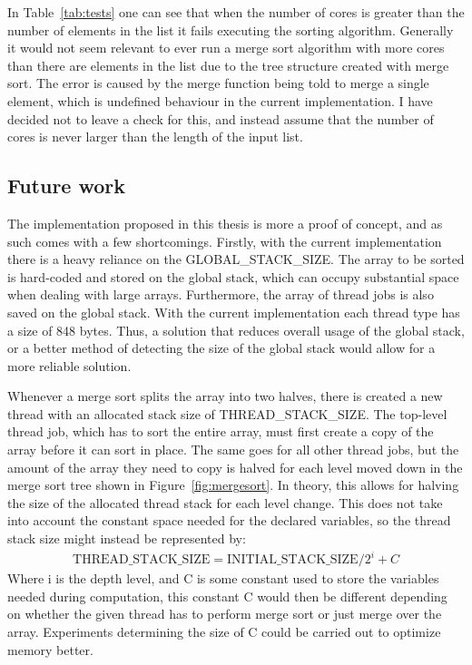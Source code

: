 In Table~\ref{tab:tests} one can see that when the number of cores is greater than
the number of elements in the list it fails executing the sorting algorithm.
Generally it would not seem relevant to ever run a merge sort algorithm with
more cores than there are elements in the list due to the tree structure created
with merge sort. The error is caused by the merge function being told to merge a
single element, which is undefined behaviour in the current implementation. I
have decided not to leave a check for this, and instead assume that the number
of cores is never larger than the length of the input list.

\subsection{Future work}
The implementation proposed in this thesis is more a proof of concept, and as
such comes with a few shortcomings. Firstly, with the current implementation
there is a heavy reliance on the GLOBAL\_STACK\_SIZE. The array to be sorted is
hard-coded and stored on the global stack, which can occupy substantial space
when dealing with large arrays. Furthermore, the array of thread jobs is also
saved on the global stack. With the current implementation each thread type has
a size of 848 bytes. Thus, a solution that reduces overall usage of the global
stack, or a better method of detecting the size of the global stack would allow
for a more reliable solution.

Whenever a merge sort splits the array into two halves, there is created a new
thread with an allocated stack size of THREAD\_STACK\_SIZE. The top-level thread
job, which has to sort the entire array, must first create a copy of the array
before it can sort in place. The same goes for all other thread jobs, but the
amount of the array they need to copy is halved for each level moved down in the
merge sort tree shown in Figure~\ref{fig:mergesort}. In theory, this allows for
halving the size of the allocated thread stack for each level change. This does
not take into account the constant space needed for the declared variables, so
the thread stack size might instead be represented by:
\begin{align}
  \text{THREAD\_STACK\_SIZE} = \text{INITIAL\_STACK\_SIZE} / 2^i + C
\end{align}
Where i is the depth level, and C is some constant used to store the variables
needed during computation, this constant C would then be different depending on
whether the given thread has to perform merge sort or just merge over the array.
Experiments determining the size of C could be carried out to optimize
memory better.

